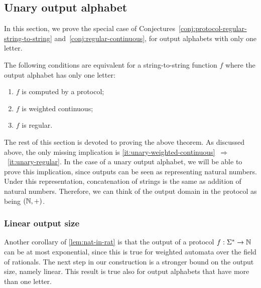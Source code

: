 \subsection{Unary output alphabet}
\label{sec:unary-output-alphabet}
In this section, we prove the special case of Conjectures~\ref{conj:protocol-regular-string-to-string} and~\ref{conj:regular-continuous}, for output alphabets with only one letter.
\begin{theorem}\label{thm:unary-string-to-string}
    The following conditions are equivalent for  a string-to-string function $f$ where  the output alphabet  has only one letter:
    \begin{enumerate}
        \item $f$ is computed by a protocol;
        \item \label{it:unary-weighted-continuous} $f$ is weighted continuous;
        \item \label{it:unary-regular} $f$ is regular.
    \end{enumerate}
\end{theorem}

The rest of this section is devoted to proving the above theorem. As discussed above, the only missing implication is \ref{it:unary-weighted-continuous}~$\Rightarrow$~\ref{it:unary-regular}. In the case of a unary output alphabet, we will be able to prove this implication, since outputs can be seen as representing natural numbers.  Under this representation, concatenation of strings is the same as addition of natural numbers. Therefore, we can think of the output domain in the protocol as being $({\mathbb N},+)$.



\subsubsection{Linear output size}
\label{sec:linear-output-size}

Another corollary  of \cref{lem:nat-in-rat} is that the output of a protocol $f : \Sigma^* \to {\mathbb N}$ can be at most exponential, since this is true for weighted automata over the field of rationals.
The next step in our construction is a stronger bound on the output size, namely linear. This result is true also for output alphabets that have more than one letter. 




